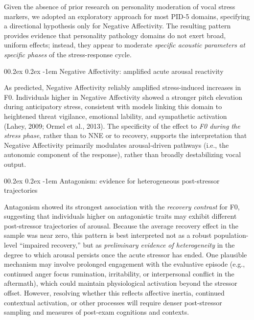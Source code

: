 \documentclass[
  english,
  man]{apa6}
\makeatletter
\let\oldparagraph\paragraph
\renewcommand{\paragraph}{
    \@ifstar
      \xxxParagraphStar
      \xxxParagraphNoStar
  }
\newcommand{\xxxParagraphStar}[1]{\oldparagraph*{#1}\mbox{}}
\newcommand{\xxxParagraphNoStar}[1]{\oldparagraph{#1}\mbox{}}
\renewcommand{\paragraph}{\@startsection{paragraph}{4}{\parindent}%
  {0\baselineskip \@plus 0.2ex \@minus 0.2ex}%
  {-1em}%
  {\normalfont\normalsize\bfseries\itshape\typesectitle}}
\makeatother
\begin{document}
Given the absence of prior research on personality moderation of vocal stress markers, we adopted an exploratory approach for most PID-5 domains, specifying a directional hypothesis only for Negative Affectivity. The resulting pattern provides evidence that personality pathology domains do not exert broad, uniform effects; instead, they appear to moderate \emph{specific acoustic parameters at specific phases} of the stress-response cycle.

\paragraph{Negative Affectivity: amplified acute arousal reactivity}\label{negative-affectivity-amplified-acute-arousal-reactivity}

As predicted, Negative Affectivity reliably amplified stress-induced increases in F0. Individuals higher in Negative Affectivity showed a stronger pitch elevation during anticipatory stress, consistent with models linking this domain to heightened threat vigilance, emotional lability, and sympathetic activation (Lahey, 2009; Ormel et al., 2013). The specificity of the effect to \emph{F0 during the stress phase}, rather than to NNE or to recovery, supports the interpretation that Negative Affectivity primarily modulates arousal-driven pathways (i.e., the autonomic component of the response), rather than broadly destabilizing vocal output.

\paragraph{Antagonism: evidence for heterogeneous post-stressor trajectories}\label{antagonism-evidence-for-heterogeneous-post-stressor-trajectories}

Antagonism showed its strongest association with the \emph{recovery contrast} for F0, suggesting that individuals higher on antagonistic traits may exhibit different post-stressor trajectories of arousal. Because the average recovery effect in the sample was near zero, this pattern is best interpreted not as a robust population-level ``impaired recovery,'' but as \emph{preliminary evidence of heterogeneity} in the degree to which arousal persists once the acute stressor has ended. One plausible mechanism may involve prolonged engagement with the evaluative episode (e.g., continued anger focus rumination, irritability, or interpersonal conflict in the aftermath), which could maintain physiological activation beyond the stressor offset. However, resolving whether this reflects affective inertia, continued contextual activation, or other processes will require denser post-stressor sampling and measures of post-exam cognitions and contexts.
\end{document}
